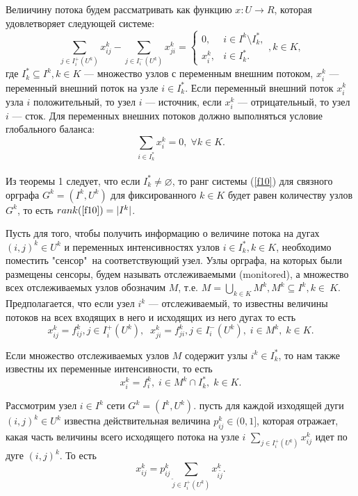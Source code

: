 \documentclass[14pt]{extarticle}%
\begin{document}
Велиичину потока будем рассматривать как функцию $x:U\to R$, которая удовлетворяет следующей системе:
\begin{equation}
    \sum_{j\in I^+_i(U^k)} x^k_{ij}-\sum_{j\in I^-_i(U^k)}x^k_{ji}=\left\{\begin{matrix}
0, & i\in I^k\setminus I^*_k,\\ 
x^k_i, & i\in I^*_k.
\end{matrix}\right., k\in K,\label{f10}
\end{equation}
где $I^*_k\subseteq I^k, k\in K$ --- множество узлов с переменным внешним потоком, $x^k_i$ --- переменный внешний поток на узле $i\in I^*_k$. Если переменный внешний поток $x^k_i$ узла $i$ положительный, то узел $i$ --- источник, если $x^k_i$ --- отрицательный, то узел $i$ --- сток. Для переменных внешних потоков должно выполняться условие глобального баланса: 
$$\sum_{i\in I^*_k}x^k_i=0,\;\forall k\in K.$$\\

Из теоремы 1 следует, что если $I^*_k\neq \varnothing$, то ранг системы (\ref{f10}) для связного орграфа $G^k=(I^k,U^k)$ для фиксированного $k\in K$ будет равен количеству узлов $G^k$, то есть $rank(\ref{f10})=|I^k|$.

Пусть для того, чтобы получить информацию о величине потока на дугах $(i,j)^k\in U^k$ и переменных интенсивностях узлов $i\in I^*_k, k\in K$, необходимо поместить "сенсор"\, на соответствующий узел. Узлы орграфа, на которых были размещены сенсоры, будем называть отслеживаемыми (monitored), а множество всех отслеживаемых узлов обозначим $M$, т.е. $M=\bigcup_{k\in K}M^k, M^k\subseteq I^k, k\in~K$. Предполагается, что если узел $i^k$ --- отслеживаемый, то известны величины потоков на всех входящих в него и исходящих из него дугах то есть
\begin{equation}
    x^k_{ij}=f^k_{ij}, j\in I^+_i(U^k),\;\; x^k_{ji}=f^k_{ji}, j\in I^-_i(U^k),\; i\in M^k,\;k\in K.\label{fs1}
\end{equation}

Если множество отслеживаемых узлов $M$ содержит узлы $i^k\in I^*_k$, то нам также известны их переменные интенсивности, то есть
\begin{equation}
x^k_{i}=f^k_i,\;i\in M^k\cap I^*_k,\;k\in K.
    \label{fs2}
\end{equation}

Рассмотрим узел $i\in I^k$ сети $G^k=(I^k,U^k)$. пусть для каждой изходящей дуги $(i,j)^k\in U^k$ известна действительная величина $p_{ij}^k\in (0,1]$, которая отражает, какая часть величины всего исходящего потока на узле $i$ $\sum_{j\in I^+_i(U^k)}x^k_{ij}$ идет по дуге $(i,j)^k$. То есть $$x^k_{ij}=p^k_{ij}\sum_{\tilde j\in I^+_i(U^k)}x^k_{i\tilde j}.$$\\
\end{document}
